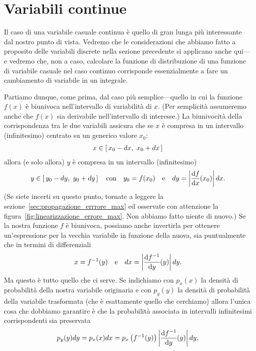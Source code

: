 \section{Variabili continue}

Il caso di una variabile casuale continua è quello di gran lunga più
interessante dal nostro punto di vista. Vedremo che le considerazioni che
abbiamo fatto a proposito delle variabili discrete nella sezione precedente
si applicano anche qui---e vedremo che, non a caso, calcolare la funzione
di distribuzione di una funzione di variabile casuale nel caso continuo
corrisponde essenzialmente a fare un cambiamento di variabile in un integrale.

Partiamo dunque, come prima, dal caso più semplice---quello in cui la funzione
$f(x)$ è biunivoca nell'intervallo di variabilità di $x$. (Per semplicità
assumeremo anche che $f(x)$ sia derivabile nell'intervallo di interesse.)
La biunivocità della corrispondenza tra le due variabili assicura che se
$x$ è compresa in un intervallo (infinitesimo) centrato su un generico valore
$x_0$:
\begin{align*}
  x \in \left[\, x_0 - dx,~x_0 + dx \,\right]
\end{align*}
allora (e solo allora) $y$ è compresa in un intervallo (infinitesimo)
\begin{align*}
  y \in \cinterval{y_0 - dy}{y_0 + dy} \quad \text{con} \quad
  y_0 = f(x_0) \quad \text{e} \quad
  dy = \abs{\td{f}{x}{x_0}} dx.
\end{align*}
(Se siete incerti su questo punto, tornate a leggere la
sezione~\ref{sec:propagazione_errrore_max} ed osservate con attenzione la
figura~\ref{fig:linearizzazione_errore_max}. Non abbiamo fatto niente di nuovo.)
Se la nostra funzione $f$ è biunivoca, possiamo anche invertirla per ottenere
un'espressione per la vecchia variabile in funzione della nuova, sia
puntualmente che in termini di differenziali
\begin{align*}
  x = f^{-1}(y) \quad \text{e} \quad
  dx = \abs{\td{f^{-1}}{y}{y}} dy.
\end{align*}
Ma questo è tutto quello che ci serve. Se indichiamo con $p_x(x)$ la densità
di probabilità della nostra variabile originaria e con $p_y(y)$ la
densità di probabilità della variabile trasformata (che è esattamente
quello che cerchiamo) allora l'unica cosa che dobbiamo garantire è che
la probabilità associata in intervalli infinitesimi corrispondenti sia
preservata
\begin{align*}
  p_y(y) dy = p_x(x) dx =
  p_x\left(f^{-1}(y)\right)\abs{\td{f^{-1}}{y}{y}} dy,
\end{align*}
